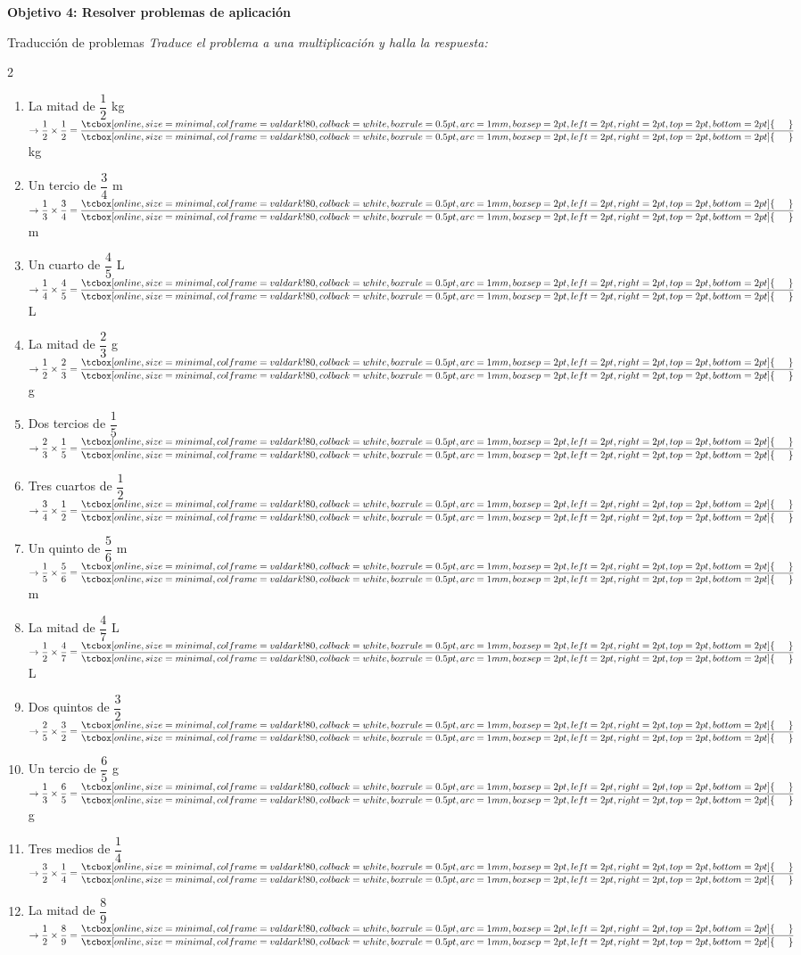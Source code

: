 \documentclass[12pt, letterpaper]{article}
\newenvironment{objetivo}[1]{%
    \begin{tcolorbox}[colback=valblue!10, colframe=valblue, arc=2mm, boxrule=1.5pt]
        {\large\bfseries \ding{118} #1}
    \end{tcolorbox}
}{}
\newcommand{\boxfill}[1][0.8cm]{\tcbox[on line, size=minimal, colframe=valdark!80, colback=white, boxrule=0.5pt, arc=1mm, boxsep=2pt, left=2pt, right=2pt, top=2pt, bottom=2pt]{\makebox[#1]{\vphantom{M}}}}
\begin{document}
\begin{objetivo}{Objetivo 4: Resolver problemas de aplicación}
    \begin{practica}{Traducción de problemas }
        \textit{Traduce el problema a una multiplicación y halla la respuesta:}
        \vspace{0.2cm}
        \begin{multicols}{2}
            \raggedcolumns
            \begin{enumerate}[itemsep=0.4cm]
                \item La mitad de $\dfrac{1}{2}$ kg $\rightarrow \dfrac{1}{2} \times \dfrac{1}{2} = \dfrac{\boxfill[0.5cm]}{\boxfill[0.5cm]}$ kg
                \item Un tercio de $\dfrac{3}{4}$ m $\rightarrow \dfrac{1}{3} \times \dfrac{3}{4} = \dfrac{\boxfill[0.5cm]}{\boxfill[0.5cm]}$ m
                \item Un cuarto de $\dfrac{4}{5}$ L $\rightarrow \dfrac{1}{4} \times \dfrac{4}{5} = \dfrac{\boxfill[0.5cm]}{\boxfill[0.5cm]}$ L
                \item La mitad de $\dfrac{2}{3}$ g $\rightarrow \dfrac{1}{2} \times \dfrac{2}{3} = \dfrac{\boxfill[0.5cm]}{\boxfill[0.5cm]}$ g
                \item Dos tercios de $\dfrac{1}{5}$ $\rightarrow \dfrac{2}{3} \times \dfrac{1}{5} = \dfrac{\boxfill[0.5cm]}{\boxfill[0.5cm]}$
                \item Tres cuartos de $\dfrac{1}{2}$ $\rightarrow \dfrac{3}{4} \times \dfrac{1}{2} = \dfrac{\boxfill[0.5cm]}{\boxfill[0.5cm]}$
                \item Un quinto de $\dfrac{5}{6}$ m $\rightarrow \dfrac{1}{5} \times \dfrac{5}{6} = \dfrac{\boxfill[0.5cm]}{\boxfill[0.5cm]}$ m
                \item La mitad de $\dfrac{4}{7}$ L $\rightarrow \dfrac{1}{2} \times \dfrac{4}{7} = \dfrac{\boxfill[0.5cm]}{\boxfill[0.5cm]}$ L
                \item Dos quintos de $\dfrac{3}{2}$ $\rightarrow \dfrac{2}{5} \times \dfrac{3}{2} = \dfrac{\boxfill[0.5cm]}{\boxfill[0.5cm]}$
                \item Un tercio de $\dfrac{6}{5}$ g $\rightarrow \dfrac{1}{3} \times \dfrac{6}{5} = \dfrac{\boxfill[0.5cm]}{\boxfill[0.5cm]}$ g
                \item Tres medios de $\dfrac{1}{4}$ $\rightarrow \dfrac{3}{2} \times \dfrac{1}{4} = \dfrac{\boxfill[0.5cm]}{\boxfill[0.5cm]}$
                \item La mitad de $\dfrac{8}{9}$ $\rightarrow \dfrac{1}{2} \times \dfrac{8}{9} = \dfrac{\boxfill[0.5cm]}{\boxfill[0.5cm]}$

\end{enumerate}
\end{multicols}
\end{practica}
\end{objetivo}
\end{document}
